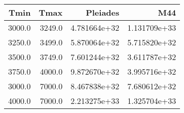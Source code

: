 \begin{tabular}{rrrr}
\toprule
      Tmin &       Tmax &      Pleiades &           M44 \\
\midrule
    3000.0 &     3249.0 &  4.781664e+32 &  1.131709e+33 \\
    3250.0 &     3499.0 &  5.870064e+32 &  5.715820e+32 \\
    3500.0 &     3749.0 &  7.601244e+32 &  3.611787e+32 \\
    3750.0 &     4000.0 &  9.872670e+32 &  3.995716e+32 \\
    3000.0 &     7000.0 &  8.467838e+32 &  7.680612e+32 \\
    4000.0 &     7000.0 &  2.213275e+33 &  1.325704e+33 \\
\bottomrule
\end{tabular}
